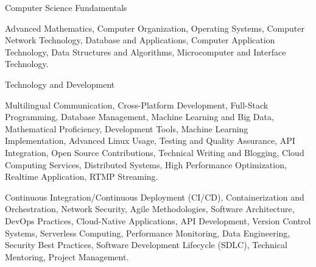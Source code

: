 \begin{cventries}
  \cventry
    {Computer Science Fundamentals} %
    {} %
    {} %
    {} %
    {
      \begin{cvitems}
        \item {Advanced Mathematics, Computer Organization, Operating Systems, Computer Network Technology, Database and Applications, Computer Application Technology, Data Structures and Algorithms, Microcomputer and Interface Technology.}
      \end{cvitems}
    }

  \cventry
    {Technology and Development} %
    {} %
    {} %
    {} %
    {
      \begin{cvitems}
        \item {Multilingual Communication, Cross-Platform Development, Full-Stack Programming, Database Management, Machine Learning and Big Data, Mathematical Proficiency, Development Tools, Machine Learning Implementation, Advanced Linux Usage, Testing and Quality Assurance, API Integration, Open Source Contributions, Technical Writing and Blogging, Cloud Computing Services, Distributed Systems, High Performance Optimization, Realtime Application, RTMP Streaming.}
        \item {Continuous Integration/Continuous Deployment (CI/CD), Containerization and Orchestration, Network Security, Agile Methodologies, Software Architecture, DevOps Practices, Cloud-Native Applications, API Development, Version Control Systems, Serverless Computing, Performance Monitoring, Data Engineering, Security Best Practices, Software Development Lifecycle (SDLC), Technical Mentoring, Project Management.}
      \end{cvitems}
    }

\end{cventries}
